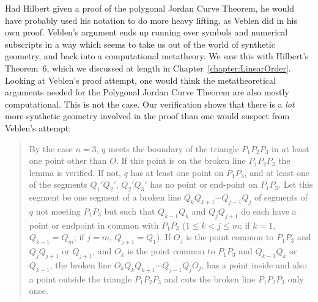 Had Hilbert given a proof of the polygonal Jordan Curve Theorem, he would have probably used his notation to do more heavy lifting, as Veblen did in his own proof. Veblen's argument ends up running over symbols and numerical subscripts in a way which seems to take us out of the world of synthetic geometry, and back into a computational metatheory. We saw this with Hilbert's Theorem~6, which we discussed at length in Chapter~\ref{chapter:LinearOrder}. Looking at Veblen's proof attempt, one would think the metatheoretical arguments needed for the Polygonal Jordan Curve Theorem are also mostly computational. This is not the case. Our verification shows that there is a \emph{lot} more synthetic geometry involved in the proof than one would suspect from Veblen's attempt:
\begin{quote}By the case $n=3$, $q$ meets the boundary of the triangle $P_1P_2P_3$ in at least one point other than $O$. If this point is on the broken line $P_1P_2P_3$ the lemma is verified. If not, $q$ has at least one point on $P_1P_3$, and at least one of the segments $Q_1'Q_2'$, $Q_2'Q_3'$ has no point or end-point on $P_1P_3$. Let this segment be one segment of a broken line $Q_kQ_{k+1}\cdots Q_{j-1}Q_j$ of segments of $q$ not meeting $P_1P_3$ but such that $Q_{k-1}Q_k$ and $Q_jQ_{j+1}$ do each have a point or endpoint in common with $P_1P_3$ ($1 \leq k < j \leq m$; if $k = 1$, $Q_{k-1} = Q_m$; if $j = m$, $Q_{j+1} = Q_1$). If $O_j$ is the point common to $P_1P_3$ and $Q_jQ_{j+1}$ or $Q_{j+1}$, and $O_k$ is the point common to $P_1P_3$ and $Q_{k-1}Q_k$ or $Q_{k-1}$, the broken line $O_kQ_kQ_{k+1}\cdots Q_{j-1}Q_jO_j$, has a point inside and also a point outside the triangle $P_1P_2P_3$ and cuts the broken line $P_1P_2P_3$ only once. \end{quote}





